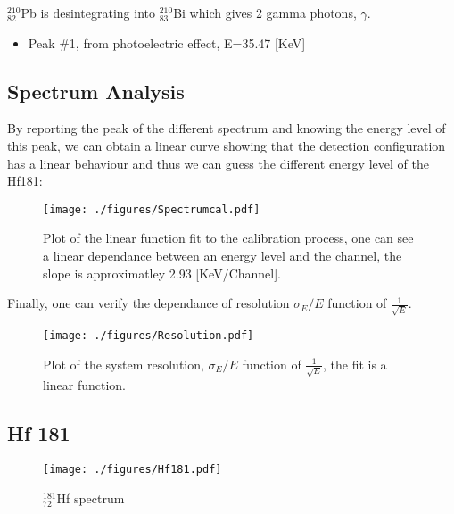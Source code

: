 \documentclass[a4paper,12pt,oneside]{article}
\begin{document}
$_{82}^{210}$Pb is desintegrating into $_{83}^{210}$Bi which gives 2 gamma photons, $\gamma$.

\begin{itemize}
\item Peak \#1, from photoelectric effect, E=35.47 [KeV]
\end{itemize}

\newpage
\subsection{Spectrum Analysis}
By reporting the peak of the different spectrum and knowing the energy level of this peak, we can obtain a linear curve showing that the detection configuration has a linear behaviour and thus we can guess the different energy level of the Hf181:


\begin{figure}[h!]
	\begin{center}
	\texttt{[image: ./figures/Spectrumcal.pdf]}
	\caption{Plot of the linear function fit to the calibration process, one can see a linear dependance between an energy level and the channel, the slope is approximatley 2.93 [KeV/Channel].} \label{fig:calibrate}
	\end{center}
\end{figure}

\newpage
Finally, one can verify the dependance of resolution $\sigma_E/E$ function of $\frac{1}{\sqrt{E}}$.
\begin{figure}[h!]
	\begin{center}
	\texttt{[image: ./figures/Resolution.pdf]}
	\caption{Plot of the system resolution, $\sigma_E/E$ function of $\frac{1}{\sqrt{E}}$, the fit is a linear function.} \label{fig:resolution}
	\end{center}
\end{figure}

\newpage
\subsection{Hf 181}

\begin{figure}[h!]
	\begin{center}
	\texttt{[image: ./figures/Hf181.pdf]}
	\caption{$_{72}^{181}$Hf spectrum} \label{fig:Hf181}
	\end{center}
\end{figure}
\end{document}
